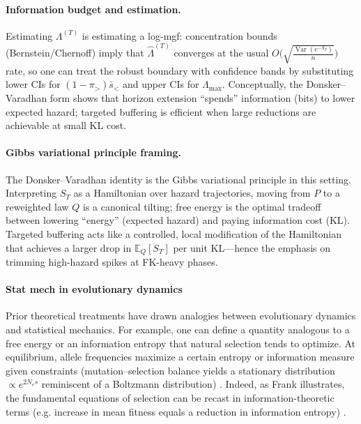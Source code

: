 \documentclass[11pt]{article}
\theoremstyle{upright}
\newcommand{\Var}{\operatorname{Var}}
\newcommand{\horizon}{\Lambda}
\newcommand{\Lmax}{\horizon^{(T)}_{\max}}
\newcommand{\hazT}[1]{\Lambda^{(#1)}}          %
\renewcommand{\Lmax}{\Lambda_{\max}}
\begin{document}
\paragraph{Information budget and estimation.}
Estimating $\hazT{T}$ is estimating a log-mgf: concentration bounds (Bernstein/Chernoff) imply that
$\widehat{\Lambda}^{(T)}$ converges at the usual $O\!\big(\sqrt{\tfrac{\Var(e^{-S_T})}{n}}\big)$ rate, so one can
treat the robust boundary with confidence bands by substituting lower CIs for $(1-\pi_>)\bar s_{<}$ and upper CIs for
$\Lmax$. Conceptually, the Donsker--Varadhan form shows that horizon extension “spends” information (bits) to lower
expected hazard; targeted buffering is efficient when large reductions are achievable at small KL cost.

\paragraph{Gibbs variational principle framing.}
The Donsker–Varadhan identity is the Gibbs variational principle in this setting.
Interpreting $S_T$ as a Hamiltonian over hazard trajectories, moving from $P$ to a reweighted law $Q$ is a canonical tilting;
free energy is the optimal tradeoff between lowering ``energy'' (expected hazard) and paying information
cost (KL). Targeted buffering acts like a controlled, local modification of the Hamiltonian that achieves a larger drop in
$\mathbb E_Q[S_T]$ per unit KL—hence the emphasis on trimming high-hazard spikes at FK-heavy phases.

\paragraph{Stat mech in evolutionary dynamics}
Prior theoretical treatments have drawn analogies between evolutionary dynamics and statistical mechanics. For example, one can define a quantity analogous to a free energy or an information entropy that natural selection tends to optimize. At equilibrium, allele frequencies maximize a certain entropy or information measure given constraints (mutation–selection balance yields a stationary distribution $\propto e^{2N_es}$ reminiscent of a Boltzmann distribution) \citep{Sella2005}. Indeed, as Frank illustrates, the fundamental equations of selection can be recast in information-theoretic terms (e.g. increase in mean fitness equals a reduction in information entropy) \citep{Frank2012}.
\end{document}

